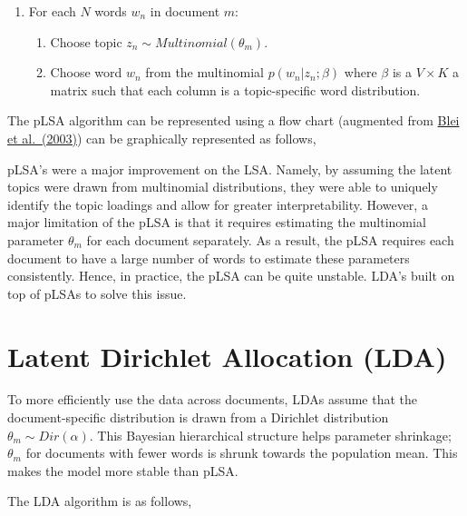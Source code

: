 \documentclass[
]{book}
\providecommand{\tightlist}{%
  \setlength{\itemsep}{0pt}\setlength{\parskip}{0pt}}
\begin{document}
\begin{enumerate}
\def\labelenumi{\arabic{enumi}.}
\tightlist
\item
  For each \(N\) words \(w_n\) in document \(m\):

  \begin{enumerate}
  \def\labelenumii{\arabic{enumii}.}
  \tightlist
  \item
    Choose topic \(z_{n} \sim Multinomial(\theta_m)\).
  \item
    Choose word \(w_n\) from the multinomial \(p(w_n|z_n;\beta)\) where \(\beta\) is a \(V\times K\) a matrix such that each column is a topic-specific word distribution.
  \end{enumerate}
\end{enumerate}

The pLSA algorithm can be represented using a flow chart (augmented from \href{https://www.jmlr.org/papers/volume3/blei03a/blei03a.pdf}{Blei et al.~(2003)}) can be graphically represented as follows,

pLSA's were a major improvement on the LSA. Namely, by assuming the latent topics were drawn from multinomial distributions, they were able to uniquely identify the topic loadings and allow for greater interpretability. However, a major limitation of the pLSA is that it requires estimating the multinomial parameter \(\theta_m\) for each document separately. As a result, the pLSA requires each document to have a large number of words to estimate these parameters consistently. Hence, in practice, the pLSA can be quite unstable. LDA's built on top of pLSAs to solve this issue.

\hypertarget{latent-dirichlet-allocation-lda}{%
\section{Latent Dirichlet Allocation (LDA)}\label{latent-dirichlet-allocation-lda}}

To more efficiently use the data across documents, LDAs assume that the document-specific distribution is drawn from a Dirichlet distribution \(\theta_m \sim Dir(\alpha)\). This Bayesian hierarchical structure helps parameter shrinkage; \(\theta_m\) for documents with fewer words is shrunk towards the population mean. This makes the model more stable than pLSA.

The LDA algorithm is as follows,
\end{document}
